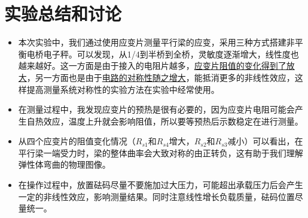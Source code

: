 \documentclass[12pt]{article}
\begin{document}
\section{实验总结和讨论}
\begin{itemize}
\item 本次实验中，我们通过使用应变片测量平行梁的应变，采用三种方式搭建非平衡电桥电子秤。可以发现，从1/4到半桥到全桥，灵敏度逐渐增大，线性度也越来越好。这一方面是由于接入的电阻片越多，\underline{应变片阻值的变化得到了放大}，另一方面也是由于\underline{电路的对称性随之增大}，能抵消更多的非线性效应，这样提高测量系统对称性的实验方法在实验中经常使用。
\item 在测量过程中，我发现应变片的预热是很有必要的，因为应变片电阻可能会产生自热效应，温度上升就会影响阻值，所以要等预热后示数稳定在进行测量。
\item 从四个应变片的阻值变化情况（$R_{s1}$和$R_{s4}$增大，$R_{s2}$和$R_{s3}$减小）可以看出，在平行梁一端受力时，梁的整体曲率会大致对称的由正转负，这有助于我们理解弹性体弯曲的物理图像。
\item 在操作过程中，放置砝码尽量不要施加过大压力，可能超出承载压力后会产生一定的非线性效应，影响测量结果。同时注意线性增长负载质量，砝码位置尽量统一。
\end{itemize}
\end{document}
